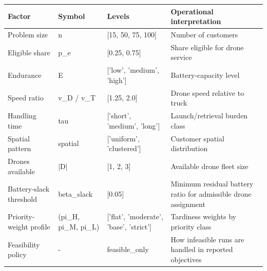 \begin{tabular}{llll}
\toprule
Factor & Symbol & Levels & Operational interpretation \\
\midrule
Problem size & n & [15, 50, 75, 100] & Number of customers \\
Eligible share & p_e & [0.25, 0.75] & Share eligible for drone service \\
Endurance & E & ['low', 'medium', 'high'] & Battery-capacity level \\
Speed ratio & v_D / v_T & [1.25, 2.0] & Drone speed relative to truck \\
Handling time & tau & ['short', 'medium', 'long'] & Launch/retrieval burden class \\
Spatial pattern & spatial & ['uniform', 'clustered'] & Customer spatial distribution \\
Drones available & |D| & [1, 2, 3] & Available drone fleet size \\
Battery-slack threshold & beta_slack & [0.05] & Minimum residual battery ratio for admissible drone assignment \\
Priority-weight profile & (pi_H, pi_M, pi_L) & ['flat', 'moderate', 'base', 'strict'] & Tardiness weights by priority class \\
Feasibility policy & - & feasible_only & How infeasible runs are handled in reported objectives \\
\bottomrule
\end{tabular}
